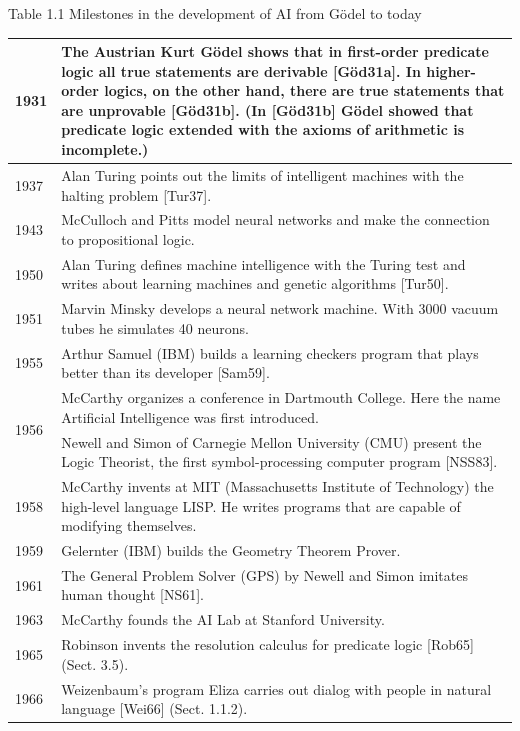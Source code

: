 \documentclass[10pt]{book}
\begin{document}
Table 1.1 Milestones in the development of AI from Gödel to today


\begin{center}
\begin{tabular}{|l|l|}
\hline
1931 & The Austrian Kurt Gödel shows that in first-order predicate logic all true statements are derivable [Göd31a]. In higher-order logics, on the other hand, there are true statements that are unprovable [Göd31b]. (In [Göd31b] Gödel showed that predicate logic extended with the axioms of arithmetic is incomplete.) \\
\hline
1937 & Alan Turing points out the limits of intelligent machines with the halting problem [Tur37]. \\
\hline
1943 & McCulloch and Pitts model neural networks and make the connection to propositional logic. \\
\hline
1950 & Alan Turing defines machine intelligence with the Turing test and writes about learning machines and genetic algorithms [Tur50]. \\
\hline
1951 & Marvin Minsky develops a neural network machine. With 3000 vacuum tubes he simulates 40 neurons. \\
\hline
1955 & Arthur Samuel (IBM) builds a learning checkers program that plays better than its developer [Sam59]. \\
\hline
\multirow[t]{2}{*}{1956} & McCarthy organizes a conference in Dartmouth College. Here the name Artificial Intelligence was first introduced. \\
\hline
 & Newell and Simon of Carnegie Mellon University (CMU) present the Logic Theorist, the first symbol-processing computer program [NSS83]. \\
\hline
1958 & McCarthy invents at MIT (Massachusetts Institute of Technology) the high-level language LISP. He writes programs that are capable of modifying themselves. \\
\hline
1959 & Gelernter (IBM) builds the Geometry Theorem Prover. \\
\hline
1961 & The General Problem Solver (GPS) by Newell and Simon imitates human thought [NS61]. \\
\hline
1963 & McCarthy founds the AI Lab at Stanford University. \\
\hline
1965 & Robinson invents the resolution calculus for predicate logic [Rob65] (Sect. 3.5). \\
\hline
1966 & Weizenbaum's program Eliza carries out dialog with people in natural language [Wei66] (Sect. 1.1.2). \\

\end{tabular}
\end{center}
\end{document}
